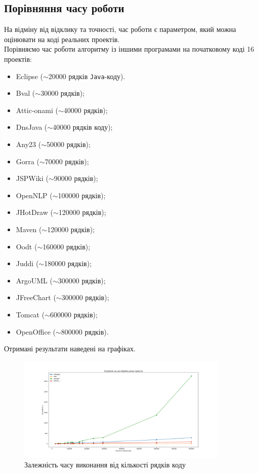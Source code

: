 \documentclass[a4paper, 14pt]{article}
\begin{document}
\subsection{Порівняння часу роботи}
На відміну від відклику та точності, час роботи є параметром, який можна оцінювати на коді реальних проектів. \\
Порівняємо час роботи алгоритму із іншими програмами на початковому коді 16 проектів:
\begin{itemize}
\item Eclipse ($\sim$20000 рядків \verb|Java|-коду).
\item Bval ($\sim$30000 рядків);
\item Attic-onami ($\sim$40000 рядків);
\item DnsJava ($\sim$40000 рядків коду);
\item Any23 ($\sim$50000 рядків);
\item Gorra ($\sim$70000 рядків);
\item JSPWiki ($\sim$90000 рядків);
\item OpenNLP ($\sim$100000 рядків);
\item JHotDraw ($\sim$120000 рядків);
\item Maven ($\sim$120000 рядків);
\item Oodt ($\sim$160000 рядків);
\item Juddi ($\sim$180000 рядків);
\item ArgoUML ($\sim$300000 рядків);
\item JFreeChart ($\sim$300000 рядків);
\item Tomcat ($\sim$600000 рядків);
\item OpenOffice ($\sim$800000 рядків).
\end{itemize}
Отримані результати наведені на графіках. \\ \newpage
\begin{figure}[h]
    \centering
    \includegraphics[width=0.9\textwidth]{graph1}
		\caption{Залежність часу виконання від кількості рядків коду}
\end{figure} \hfill \\
\end{document}
